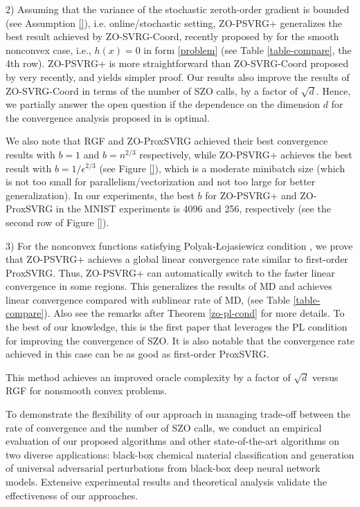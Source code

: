 \documentclass{article}
\theoremstyle{definition}
\theoremstyle{remark}
\begin{document}
{{\color{Violet} 2) Assuming that the variance of the stochastic zeroth-order gradient is bounded (see Assumption \ref{}), i.e. online/stochastic setting,
ZO-PSVRG+ generalizes the best result achieved by ZO-SVRG-Coord, recently proposed by \cite{liu2018zeroth} for the smooth nonconvex case, i.e., $h(x) = 0$ in form \eqref{problem} (see Table \ref{table-compare}, the 4th row). ZO-PSVRG+ is more straightforward than ZO-SVRG-Coord proposed by \cite{liu2018zeroth} very recently, and yields simpler proof. Our results also improve the results of ZO-SVRG-Coord  in terms of the number of SZO calls, by a factor of $\sqrt{d}$. {\color{Brown}
Hence, we partially answer the open question if the dependence on the dimension $d$ for the convergence analysis proposed in \cite{liu2018zeroth} is optimal. 
}
}



}
{\color{Violet}
We also note that RGF \cite{} and ZO-ProxSVRG \cite{liu2018zeroth} achieved their best convergence
results with $b = 1$ and $b = n^{2/3}$ respectively, while ZO-PSVRG+ achieves the best result with $b = 1/\epsilon^{2/3}$ (see
Figure \ref{}), which is a moderate minibatch size (which is not too small for parallelism/vectorization and not too
large for better generalization). In our experiments, the best $b$ for ZO-PSVRG+ and ZO-ProxSVRG in the MNIST
experiments is 4096 and 256, respectively (see the second row of Figure \ref{}).

3) For the nonconvex functions satisfying Polyak-Łojasiewicz condition \cite{polyak1963gradient}, we prove that ZO-PSVRG+
achieves a global linear convergence rate similar to first-order ProxSVRG. Thus, ZO-PSVRG+ can automatically switch to
the faster linear convergence in some regions. This generalizes the results of MD \cite{duchi2015optimal} and  achieves linear convergence compared with sublinear rate of MD, (see Table \ref{table-compare}). Also see the remarks after Theorem \ref{zo-pl-cond} for more details. {\color{RubineRed}
To the best of
our knowledge, this is the first paper that leverages the PL condition for improving the convergence of SZO. It is also notable that the convergence rate achieved in this case can be as good as first-order ProxSVRG.
}
}
{\color{DarkOrchid}
This method achieves an improved oracle complexity by a factor of $\sqrt{d}$ versus RGF for nonsmooth convex problems.

}

{\color{Brown}
 To demonstrate the flexibility of our approach in managing trade-off between the rate of convergence and the number of SZO calls, we conduct an
empirical evaluation of our proposed algorithms and other state-of-the-art algorithms on two diverse
applications: black-box chemical material classification and generation of universal adversarial
perturbations from black-box deep neural network models. Extensive experimental results and
theoretical analysis validate the effectiveness of our approaches.
}
\end{document}
